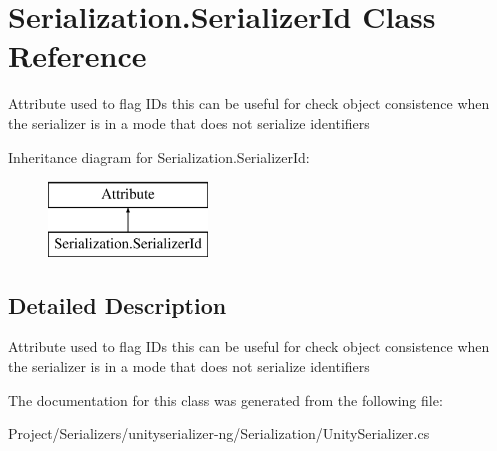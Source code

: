 \hypertarget{class_serialization_1_1_serializer_id}{}\section{Serialization.\+Serializer\+Id Class Reference}
\label{class_serialization_1_1_serializer_id}


Attribute used to flag I\+Ds this can be useful for check object consistence when the serializer is in a mode that does not serialize identifiers  


Inheritance diagram for Serialization.\+Serializer\+Id\+:\begin{figure}[H]
\begin{center}
\leavevmode
\includegraphics[height=2.000000cm]{class_serialization_1_1_serializer_id}
\end{center}
\end{figure}


\subsection{Detailed Description}
Attribute used to flag I\+Ds this can be useful for check object consistence when the serializer is in a mode that does not serialize identifiers 



The documentation for this class was generated from the following file\+:\begin{DoxyCompactItemize}
\item 
Project/\+Serializers/unityserializer-\/ng/\+Serialization/Unity\+Serializer.\+cs\end{DoxyCompactItemize}
